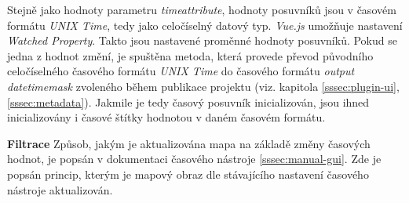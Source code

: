 Stejně jako hodnoty parametru \textit{time\textunderscore attribute},
hodnoty posuvníků jsou v časovém formátu \textit{UNIX Time}, tedy
jako celočíselný datový typ. \textit{Vue.js} umožňuje nastavení
\textit{Watched Property}. Takto jsou nastavené proměnné hodnoty
posuvníků. Pokud se jedna z hodnot změní, je spuštěna metoda,
která provede převod původního celočíselného časového formátu
\textit{UNIX Time} do časového formátu \textit{output\textunderscore
datetime\textunderscore mask} zvoleného během publikace projektu
(viz. kapitola \ref{sssec:plugin-ui}, \ref{sssec:metadata}). Jakmile je tedy
časový posuvník inicializován, jsou ihned inicializovány i časové
štítky hodnotou v daném časovém formátu.

\bigskip
\noindent \textbf{Filtrace}
Způsob, jakým je aktualizována mapa na základě změny časových hodnot, je
popsán v dokumentaci časového nástroje \ref{sssec:manual-gui}. Zde je popsán princip, kterým je
mapový obraz dle stávajícího nastavení časového nástroje aktualizován.

